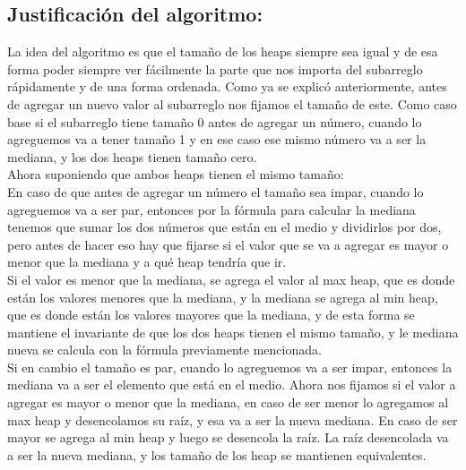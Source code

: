 \documentclass[10pt, a4paper]{article}
\begin{document}
		\subsection{Justificación del algoritmo:}
		 La idea del algoritmo es que el tama\~no de los heaps siempre sea igual y de esa forma poder siempre ver f\'acilmente la parte que nos importa del subarreglo r\'apidamente y de una forma ordenada. Como ya se explic\'o anteriormente, antes de agregar un nuevo valor al subarreglo nos fijamos el tama\~no de este. Como caso base si el subarreglo tiene tama\~no 0 antes de agregar un n\'umero, cuando lo agreguemos va a tener tama\~no 1 y en ese caso ese mismo n\'umero va a ser la mediana, y los dos heaps tienen tama\~no cero.
		\\Ahora suponiendo que ambos heaps tienen el mismo tama\~no:
		\\ En caso de que antes de agregar un n\'umero el tama\~no sea impar, cuando lo agreguemos va a ser par, entonces por la f\'ormula para calcular la mediana tenemos que sumar los dos n\'umeros que est\'an en el medio y dividirlos por dos, pero antes de hacer eso hay que fijarse si el valor que se va a agregar es mayor o menor que la mediana y a qu\'e heap tendr\'ia que ir.
		\\Si el valor es menor que la mediana, se agrega el valor al max heap, que es donde est\'an los valores menores que la mediana, y la mediana se agrega al min heap, que es donde est\'an los valores mayores que la mediana, y de esta forma se mantiene el invariante de que los dos heaps tienen el mismo tamaño, y le mediana nueva se calcula con la f\'ormula previamente mencionada.
		\\ Si en cambio el tama\~no es par, cuando lo agreguemos va a ser impar, entonces la mediana va a ser el elemento que est\'a en el medio. Ahora nos fijamos si el valor a agregar es mayor o menor que la mediana, en caso de ser menor lo agregamos al max heap y desencolamos su ra\'iz, y esa va a ser la nueva mediana. En caso de ser mayor se agrega al min heap y luego se desencola la ra\'iz. La ra\'iz desencolada va a ser la nueva mediana, y los tama\~no de los heap se mantienen equivalentes.
\end{document}
